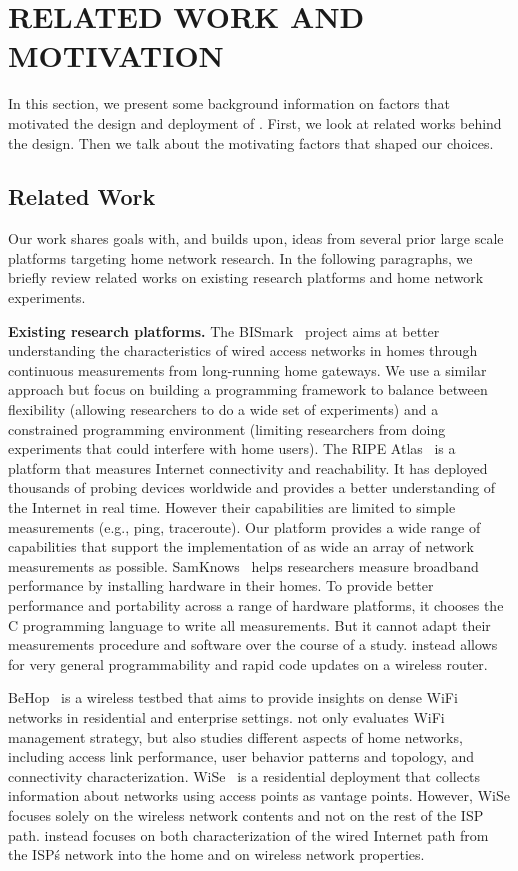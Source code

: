 \chapter{RELATED WORK AND MOTIVATION}
\label{sec.relatedwork_motivation}
In this section, we present some background information on factors that motivated the design and deployment of \sysname. First, we look at related works behind the design. Then we talk about the motivating factors that shaped our choices.
\section{Related Work}
\label{ssec.related_work}
Our work shares goals with, and builds upon, ideas from several prior large scale platforms targeting home network research. In the following paragraphs, we briefly review related works on existing research platforms and home network experiments.  

\textbf{Existing research platforms. }The BISmark~\cite{183951} project aims at better understanding the characteristics of wired access networks in homes through continuous measurements from long-running home gateways. We use a similar approach but focus on building a programming framework to balance between flexibility (allowing researchers to do a wide set of experiments) and a constrained programming environment (limiting researchers from doing experiments that could interfere with home users). The RIPE Atlas~\cite{ripeatlas} is a platform that measures Internet connectivity and reachability. It has deployed thousands of probing devices worldwide and provides a better understanding of the Internet in real time. However their capabilities are limited to simple measurements (e.g., ping, traceroute). Our platform provides a wide range of capabilities that support the implementation of as wide an array of network measurements as possible. SamKnows~\cite{samknows} helps researchers measure broadband performance by installing hardware in their homes. To provide better performance and portability across a range of hardware platforms, it chooses the C programming language to write all measurements. But it cannot adapt their measurements procedure and software over the course of a study. \sysname instead allows for very general programmability and rapid code updates on a wireless router. 

BeHop~\cite{yiakoumis2014behop} is a wireless testbed that aims to provide insights on dense WiFi networks in residential and enterprise settings. \sysname not only evaluates WiFi management strategy, but also studies different aspects of home networks, including access link performance, user behavior patterns and topology, and connectivity characterization. WiSe~\cite{patro2013observing} is a residential deployment that collects information about networks using access points as vantage points. However, WiSe focuses solely on the wireless network contents and not on the rest of the ISP path. \sysname instead focuses on both characterization of the wired Internet path from the ISP\'s network into the home and on wireless network properties.

